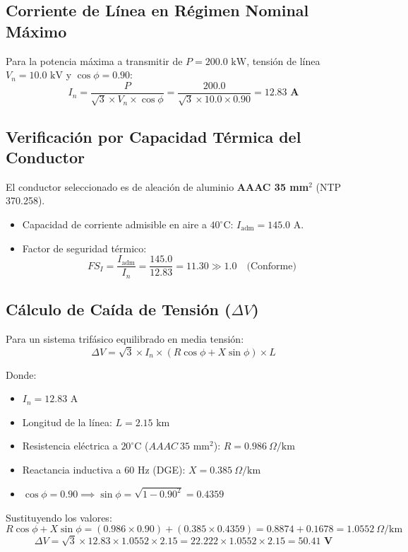 \subsection{Corriente de Línea en Régimen Nominal Máximo}
Para la potencia máxima a transmitir de $P = 200.0\text{ kW}$, tensión de línea $V_n = 10.0\text{ kV}$ y $\cos\phi = 0.90$:
$$I_n = \frac{P}{\sqrt{3} \times V_n \times \cos\phi} = \frac{200.0}{\sqrt{3} \times 10.0 \times 0.90} = \mathbf{12.83\text{ A}}$$

\subsection{Verificación por Capacidad Térmica del Conductor}
El conductor seleccionado es de aleación de aluminio \textbf{AAAC 35 mm$^2$} (NTP 370.258).
\begin{itemize}
  \item Capacidad de corriente admisible en aire a $40^\circ\text{C}$: $I_{\text{adm}} = 145.0\text{ A}$.
  \item Factor de seguridad térmico:
    $$FS_I = \frac{I_{\text{adm}}}{I_n} = \frac{145.0}{12.83} = 11.30 \gg 1.0 \quad \text{(Conforme)}$$
\end{itemize}

\subsection{Cálculo de Caída de Tensión ($\Delta V$)}
Para un sistema trifásico equilibrado en media tensión:
$$\Delta V = \sqrt{3} \times I_n \times \left( R \cos\phi + X \sin\phi \right) \times L$$

Donde:
\begin{itemize}
  \item $I_n = 12.83\text{ A}$
  \item Longitud de la línea: $L = 2.15\text{ km}$
  \item Resistencia eléctrica a $20^\circ\text{C}$ ($AAAC\ 35\text{ mm}^2$): $R = 0.986\ \Omega/\text{km}$
  \item Reactancia inductiva a $60\text{ Hz}$ (DGE): $X = 0.385\ \Omega/\text{km}$
  \item $\cos\phi = 0.90 \implies \sin\phi = \sqrt{1 - 0.90^2} = 0.4359$
\end{itemize}

Sustituyendo los valores:
$$R \cos\phi + X \sin\phi = (0.986 \times 0.90) + (0.385 \times 0.4359) = 0.8874 + 0.1678 = 1.0552\ \Omega/\text{km}$$
$$\Delta V = \sqrt{3} \times 12.83 \times 1.0552 \times 2.15 = 22.222 \times 1.0552 \times 2.15 = \mathbf{50.41\text{ V}}$$

